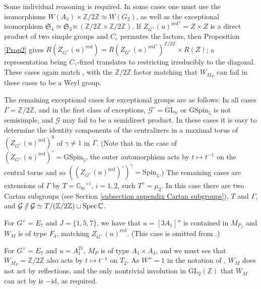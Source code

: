 \documentclass[10pt]{article}
\newcommand{\id}{\mathrm{id}}
\DeclareMathOperator{\Spec}{Spec}
\newcommand{\git}{\mathbin{
  \mathchoice{/\mkern-6mu/}%
    {/\mkern-6mu/}%
    {/\mkern-5mu/}%
    {/\mkern-5mu/}}}%
\newcommand{\Z}{\mathbb{Z}}
\newcommand{\C}{\mathbb{C}}
\newcommand{\GL}{\mathrm{GL}}
\newcommand{\Spin}{\mathrm{Spin}}
\newcommand{\Gm}{{\mathbb{G}_\mathrm{m}}}
\newcommand{\Sn}{\mathfrak{S}}
\theoremstyle{definition}
\theoremstyle{remark}
\newcommand{\Zur}{Z_{G^\vee}(u)^{\mathrm{red}}}
\newcommand{\Zz}{\mathcal{G}}
\begin{document}
Some individual reasoning is required. In some 
cases one must use the isomorphisms $W(A_3)\times\Z/2\Z\simeq W(G_2)$, as well as the exceptional isomorphism
$\Sn_4\simeq\Sn_3\ltimes(\Z/2\Z\times\Z/2\Z)$. 
If ${\Zur}^\circ=Z\times Z$ is a direct product of two simple groups and 
$C_\epsilon$ permutes the factors, then Proposition \ref{Prop2} gives 
$R(\Zur)=R({\Zur}^\circ)^{\Z/2\Z}\times R(Z)$; a representation being $C_\gamma$-fixed translates to restricting 
irreducibly to the diagonal. These cases again match \cite{Howlett}, with the $\Z/2\Z$ factor
matching that $W_{M_P}$ can fail in these cases to be a Weyl group. 

The remaining exceptional cases for exceptional groups are as follows: In all cases $\Gamma=\Z/2\Z$, and
in the first class of exceptions, $\Zz^\circ=\GL_n$ or $\mathrm{GSpin}_5$ is not semisimple, and $\Zz$ may fail 
to be a semidirect product. In these cases it is easy to determine the identity components of the centralizers in a maximal torus of $(\Zur)^0$ of $\gamma\neq 1$ in $\Gamma$.
(Note that in the case of $(\Zur)^\circ=\mathrm{GSpin}_5$, the outer automorphism
acts by $t\mapsto t^{-1}$ on the central torus and so $((\Zur)^\circ)^\gamma=\Spin_5$.) The remaining cases
are extensions of $\Gamma$ by $T=\Gm^{\times i}$, $i=1,2$, such $T^\gamma=\mu_2$. In 
this case there are two Cartan subgroups (see Section \ref{subsection appendix Cartan subgroups}), $T$ and $\Gamma$, and $\Zz\git\Zz\simeq T/(\Z/2\Z)\sqcup\Spec\C$.

For $G^\vee=E_7$ and
$J=\{1,5,7\}$, we have that $u=[3A_1]''$ is contained in $M_{P_J}$ and $W_M$ is of type $F_4$, matching 
$\Zur$. (This case is omitted from \cite{Howlett}.)

For $G^\vee=E_7$ and $u=A_1^{21}$, $M_P$ is of type $A_1\times A_4$, and we must see that 
$W_{M_P}=\Z/2\Z$ also acts by $t\mapsto t^{-1}$ on $T_2$. As $W''=1$ in the notation of \cite{Howlett}, $W_M$ 
does not act by reflections, and the only nontrivial involution in $\GL_2(\Z)$ that $W_M$ can act by is $-\id$, 
as required.
\end{document}
